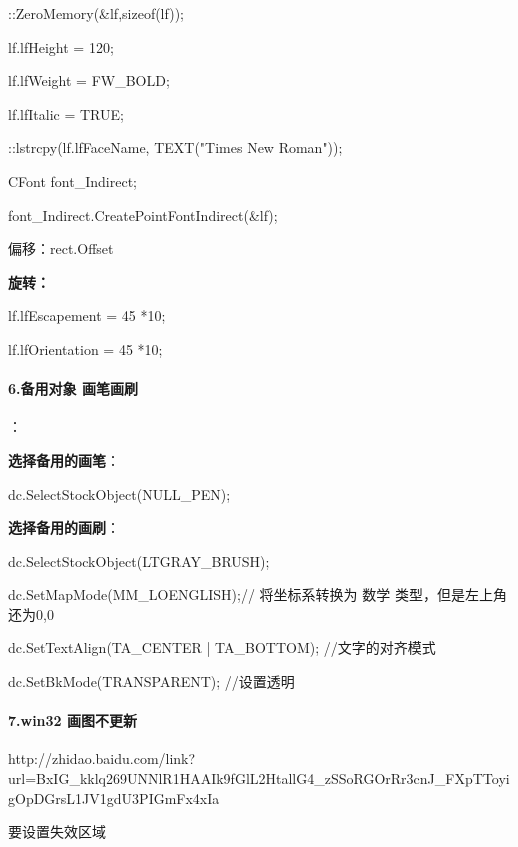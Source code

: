 \documentclass[UTF8,a4paper,8pt]{ctexart}
\begin{document}
		     ::ZeroMemory(\&lf,sizeof(lf));
		     
		     lf.lfHeight = 120;
		     
		     lf.lfWeight = FW\_BOLD;
		     
		     lf.lfItalic = TRUE;
		     
		     ::lstrcpy(lf.lfFaceName, TEXT("Times New Roman"));
		     
		     CFont font\_Indirect;
		     
		     font\_Indirect.CreatePointFontIndirect(\&lf);
		     
		     偏移：rect.Offset
		     
		     \textbf{旋转：}
		     
		     lf.lfEscapement = 45 *10;
		     
		     lf.lfOrientation = 45 *10;
	     
	     \paragraph{6.备用对象 画笔画刷}：
	     
		     \textbf{选择备用的画笔}：
		     
		     dc.SelectStockObject(NULL\_PEN); 
		     
		     \textbf{选择备用的画刷}：
		     
		     dc.SelectStockObject(LTGRAY\_BRUSH);
		     
		     dc.SetMapMode(MM\_LOENGLISH);// 将坐标系转换为 数学 类型，但是左上角还为0,0
		     
		     dc.SetTextAlign(TA\_CENTER | TA\_BOTTOM); //文字的对齐模式
		     
		     dc.SetBkMode(TRANSPARENT); //设置透明     
	     
	     \paragraph{7.win32 画图不更新}
		     http://zhidao.baidu.com/link?url=BxIG\_kklq269UNNlR1HAAIk9fGlL2HtallG4\_zSSoRGOrRr3cnJ\_FXpTToyigOpDGrsL1JV1gdU3PIGmFx4xIa
	     
		     要设置失效区域
     
  
\end{document}
